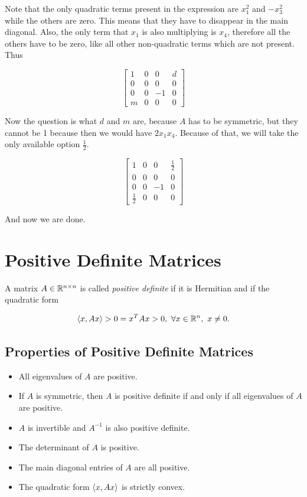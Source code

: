 Note that the only quadratic terms present in the expression are \(x_{1}^{2}\) and \(-x_{3}^{2}\) while the 
others are zero. This means that they have to disappear in the main diagonal. Also, the only term 
that \(x_1\) is also multiplying is \(x_4\), therefore all the others have to be zero, like all 
other non-quadratic terms which are not present. Thus 

\[
    \begin{bmatrix}
        1 & 0 & 0 & d \\
        0 & 0 & 0 & 0 \\
        0 & 0 & -1 & 0 \\
        m & 0 & 0 & 0  
    \end{bmatrix}
\]

Now the question is what \(d\) and \(m\) are, because \(A\) has to be symmetric, but they cannot be 1 
because then we would have \(2x_1 x_4\). Because of that, we will take the only available option 
\(\frac{1}{2}\).

\[
    \begin{bmatrix}
        1 & 0 & 0 & \frac{1}{2} \\
        0 & 0 & 0 & 0 \\
        0 & 0 & -1 & 0 \\
        \frac{1}{2} & 0 & 0 & 0  
    \end{bmatrix}
\]

And now we are done.

\section{Positive Definite Matrices}

A matrix \(A \in \mathbb{R}^{n \times n}\) is called \emph{positive definite} if it is Hermitian and if the quadratic form

\[
    \inner{x}{Ax} > 0 = x^T Ax > 0, \ \forall x \in \R^n, \ x \ne 0.
\]

\subsection{Properties of Positive Definite Matrices}

\begin{itemize}
    
    \item All eigenvalues of \(A\) are positive.

    \item If \(A\) is symmetric, then \(A\) is positive definite if and only if all eigenvalues of \(A\) are positive.

    \item \(A\) is invertible and \(A^{-1}\) is also positive definite.

    \item The determinant of \(A\) is positive.

    \item The main diagonal entries of \(A\) are all positive.

    \item The quadratic form \(\left\langle x, Ax\right\rangle\) is strictly convex.

\end{itemize}

